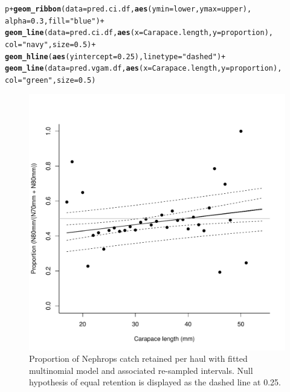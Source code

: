 \documentclass[12pt]{article}\usepackage[]{graphicx}\usepackage[]{color}
\makeatletter
\def\maxwidth{ %
  \ifdim\Gin@nat@width>\linewidth
    \linewidth
  \else
    \Gin@nat@width
  \fi
}
\newcommand{\hlnum}[1]{\textcolor[rgb]{0.686,0.059,0.569}{#1}}%
\newcommand{\hlstr}[1]{\textcolor[rgb]{0.192,0.494,0.8}{#1}}%
\newcommand{\hlopt}[1]{\textcolor[rgb]{0,0,0}{#1}}%
\newcommand{\hlstd}[1]{\textcolor[rgb]{0.345,0.345,0.345}{#1}}%
\newcommand{\hlkwc}[1]{\textcolor[rgb]{0.333,0.667,0.333}{#1}}%
\newcommand{\hlkwd}[1]{\textcolor[rgb]{0.737,0.353,0.396}{\textbf{#1}}}%
\newenvironment{kframe}{%
 \def\at@end@of@kframe{}%
 \ifinner\ifhmode%
  \def\at@end@of@kframe{\end{minipage}}%
  \begin{minipage}{\columnwidth}%
 \fi\fi%
 \def\FrameCommand##1{\hskip\@totalleftmargin \hskip-\fboxsep
 \colorbox{shadecolor}{##1}\hskip-\fboxsep
     \hskip-\linewidth \hskip-\@totalleftmargin \hskip\columnwidth}%
 \MakeFramed {\advance\hsize-\width
   \@totalleftmargin\z@ \linewidth\hsize
   \@setminipage}}%
 {\par\unskip\endMakeFramed%
 \at@end@of@kframe}
\newenvironment{knitrout}{}{} %
\makeatother
\begin{document}
\begin{knitrout}
\begin{kframe}
\begin{alltt}
\hlstd{p} \hlopt{+} \hlkwd{geom_ribbon}\hlstd{(}\hlkwc{data}\hlstd{=pred.ci.df,} \hlkwd{aes}\hlstd{(}\hlkwc{ymin} \hlstd{= lower,} \hlkwc{ymax} \hlstd{= upper),}
                \hlkwc{alpha}\hlstd{=}\hlnum{0.3}\hlstd{,} \hlkwc{fill} \hlstd{=} \hlstr{"blue"}\hlstd{)} \hlopt{+}
  \hlkwd{geom_line}\hlstd{(}\hlkwc{data} \hlstd{= pred.ci.df,} \hlkwd{aes}\hlstd{(}\hlkwc{x} \hlstd{= Carapace.length,} \hlkwc{y} \hlstd{= proportion),}
            \hlkwc{col} \hlstd{=} \hlstr{"navy"}\hlstd{,} \hlkwc{size} \hlstd{=} \hlnum{0.5}\hlstd{)} \hlopt{+}
  \hlkwd{geom_hline}\hlstd{(}\hlkwd{aes}\hlstd{(}\hlkwc{yintercept} \hlstd{=} \hlnum{0.25}\hlstd{),} \hlkwc{linetype} \hlstd{=} \hlstr{"dashed"}\hlstd{)} \hlopt{+}
  \hlkwd{geom_line}\hlstd{(}\hlkwc{data} \hlstd{= pred.vgam.df,} \hlkwd{aes}\hlstd{(}\hlkwc{x} \hlstd{= Carapace.length,} \hlkwc{y} \hlstd{= proportion),}
            \hlkwc{col} \hlstd{=} \hlstr{"green"}\hlstd{,} \hlkwc{size} \hlstd{=} \hlnum{0.5}\hlstd{)}
\end{alltt}
\end{kframe}\begin{figure}
\includegraphics[width=\maxwidth]{figure/unnamed-chunk-7-1} \caption[Proportion of Nephrops catch retained per haul with fitted multinomial model and associated re-sampled intervals]{Proportion of Nephrops catch retained per haul with fitted multinomial model and associated re-sampled intervals. Null hypothesis of equal retention is displayed as the dashed line at 0.25.}\label{fig:unnamed-chunk-7}
\end{figure}


\end{knitrout}
\end{document}
